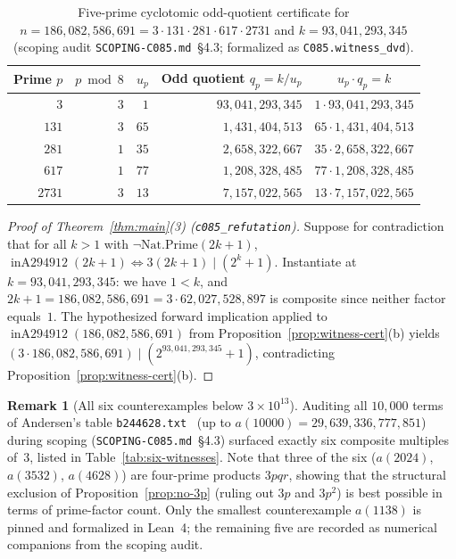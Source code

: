 \documentclass[11pt]{article}
\theoremstyle{definition}
\newtheorem{remark}[theorem]{Remark}
\newcommand{\inA}{\operatorname{inA294912}}
\begin{document}
\begin{table}[ht]
\centering
\caption{Five-prime cyclotomic odd-quotient certificate for $n = 186{,}082{,}586{,}691 = 3 \cdot 131 \cdot 281 \cdot 617 \cdot 2731$ and $k = 93{,}041{,}293{,}345$ (scoping audit \texttt{SCOPING-C085.md}~\S4.3; formalized as \texttt{C085.witness\_dvd}).}
\label{tab:cert}
\smallskip
{\small
\begin{tabular}{@{}r r r r c@{}}
\toprule
Prime $p$ & $p \bmod 8$ & $u_p$ & Odd quotient $q_p = k / u_p$ & $u_p \cdot q_p = k$ \\
\midrule
$3$ & $3$ & $1$ & $93{,}041{,}293{,}345$ & $1 \cdot 93{,}041{,}293{,}345$ \\
$131$ & $3$ & $65$ & $1{,}431{,}404{,}513$ & $65 \cdot 1{,}431{,}404{,}513$ \\
$281$ & $1$ & $35$ & $2{,}658{,}322{,}667$ & $35 \cdot 2{,}658{,}322{,}667$ \\
$617$ & $1$ & $77$ & $1{,}208{,}328{,}485$ & $77 \cdot 1{,}208{,}328{,}485$ \\
$2731$ & $3$ & $13$ & $7{,}157{,}022{,}565$ & $13 \cdot 7{,}157{,}022{,}565$ \\
\bottomrule
\end{tabular}
}
\end{table}

\begin{proof}[Proof of Theorem~\ref{thm:main}(3) (\texttt{c085\_refutation})]
Suppose for contradiction that for all $k > 1$ with $\neg\mathrm{Nat.Prime}(2k + 1)$, $\inA(2k + 1) \iff 3(2k + 1) \mid (2^k + 1)$. Instantiate at $k = 93{,}041{,}293{,}345$: we have $1 < k$, and $2k + 1 = 186{,}082{,}586{,}691 = 3 \cdot 62{,}027{,}528{,}897$ is composite since neither factor equals~$1$. The hypothesized forward implication applied to $\inA(186{,}082{,}586{,}691)$ from Proposition~\ref{prop:witness-cert}(b) yields $(3 \cdot 186{,}082{,}586{,}691) \mid (2^{93{,}041{,}293{,}345} + 1)$, contradicting Proposition~\ref{prop:witness-cert}(b).
\end{proof}

\begin{remark}[All six counterexamples below $3 \times 10^{13}$]
Auditing all $10{,}000$ terms of Andersen's table \texttt{b244628.txt}~\cite{b244628} (up to $a(10000) = 29{,}639{,}336{,}777{,}851$) during scoping (\texttt{SCOPING-C085.md}~\S4.3) surfaced exactly six composite multiples of~$3$, listed in Table~\ref{tab:six-witnesses}. Note that three of the six ($a(2024)$, $a(3532)$, $a(4628)$) are four-prime products $3pqr$, showing that the structural exclusion of Proposition~\ref{prop:no-3p} (ruling out $3p$ and $3p^2$) is best possible in terms of prime-factor count. Only the smallest counterexample $a(1138)$ is pinned and formalized in Lean~4; the remaining five are recorded as numerical companions from the scoping audit.
\end{remark}
\end{document}
